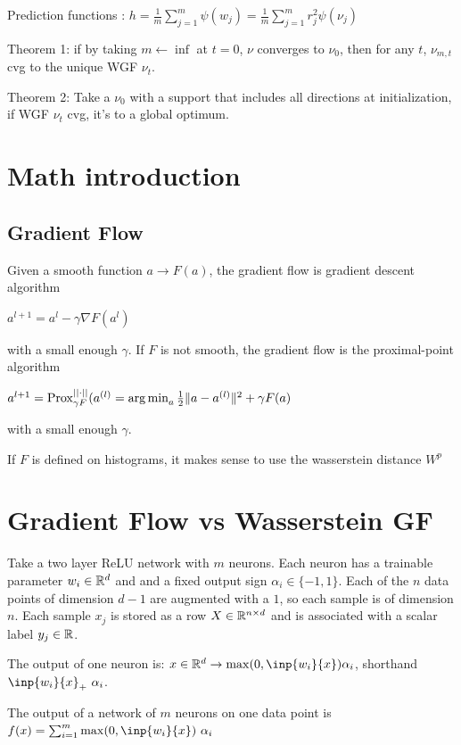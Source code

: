 Prediction functions : $h = \frac{1}{m} \sum_{j=1}^{m} \psi(w_j) = \frac{1}{m}\sum_{j=1}^{m} r_j^2 \psi(\nu_j)$

Theorem 1: if by taking $m \leftarrow \inf$ at $t=0$, $\nu$ converges to $\nu_0$, then for any $t$, $\nu_{m, t}$ cvg to the unique WGF $\nu_t$.

Theorem 2: Take a $\nu_0$ with a support that includes all directions at initialization, if WGF $\nu_t$ cvg, it's to a global optimum.

\section{Math introduction}

\subsection{Gradient Flow}

Given a smooth function $a \rightarrow F(a)$, the gradient flow is gradient descent algorithm

$a^{l+1} = a^l - \gamma \nabla F(a^l)$

with a small enough $\gamma$. If $F$ is not smooth, the gradient flow is the proximal-point algorithm

$a^{l+1} = \operatorname{Prox}^{||\cdot ||}_{\gamma F}(a^{(l)} = \operatorname*{arg\,min}_a \frac{1}{2} \lVert a - a^{(l)}\rVert^2 + \gamma F(a)$

with a small enough $\gamma$.

If $F$ is defined on histograms, it makes sense to use the wasserstein distance $W^p$

\section{Gradient Flow vs Wasserstein GF}

Take a two layer ReLU network with $m$ neurons. Each neuron has a trainable parameter $w_i \in \mathbb{R}^d$ and and a fixed output sign $\alpha_i \in \{-1, 1\}$. Each of the $n$ data points of dimension $d-1$ are augmented with a $1$, so each sample is of dimension $n$. Each sample $x_j$ is stored as a row $X \in \mathbb{R}^{n \times d}$  and is associated with a scalar label $y_j \in \mathbb{R}$.

The output of one neuron is: $x \in \R^d \rightarrow \max(0, \inp{w_i}{x}) \alpha_i$, shorthand $\inp{w_i}{x}_+ ~ \alpha_i$.

The output of a network of $m$ neurons on one data point is $f(x) = \sum_{i=1}^{m} \max(0, \inp{w_i}{x}) ~ \alpha_i$

